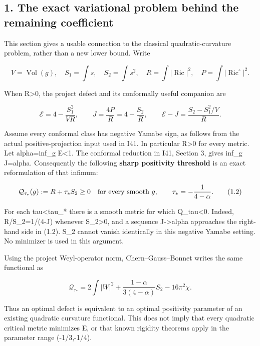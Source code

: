 \documentclass[
  10pt,
]{article}
\begin{document}
\hypertarget{the-exact-variational-problem-behind-the-remaining-coefficient}{%
\subsection{1. The exact variational problem behind the remaining
coefficient}\label{the-exact-variational-problem-behind-the-remaining-coefficient}}

This section gives a usable connection to the classical
quadratic-curvature problem, rather than a new lower bound. Write

\[
 V=\operatorname{Vol}(g),\quad S_1=\int s,\quad S_2=\int s^2,
 \quad R=\int|\operatorname{Ric}|^2,\quad
 P=\int|\operatorname{Ric}^{\circ}|^2.
\]

When R\textgreater0, the project defect and its conformally useful
companion are

\[
 \mathcal E=4-\frac{S_1^2}{VR},\qquad
 J=\frac{4P}{R}=4-\frac{S_2}{R},\qquad
 \mathcal E-J=\frac{S_2-S_1^2/V}{R}.                 \tag{1.1}
\]

Assume every conformal class has negative Yamabe sign, as follows from
the actual positive-projection input used in I41. In particular
R\textgreater0 for every metric. Let alpha=inf\_g E\textless1. The
conformal reduction in I41, Section 3, gives inf\_g J=alpha.
Consequently the following \textbf{sharp positivity threshold} is an
exact reformulation of that infimum:

\[
 \mathcal Q_{\tau_*}(g):=R+\tau_*S_2\ge0\quad
 \hbox{for every smooth }g,\qquad
 \tau_*=-\frac1{4-\alpha}.                            \tag{1.2}
\]

For each tau\textless tau\_* there is a smooth metric for which
Q\_tau\textless0. Indeed, R/S\_2=1/(4-J) whenever S\_2\textgreater0, and
a sequence J-\textgreater alpha approaches the right-hand side in (1.2).
S\_2 cannot vanish identically in this negative Yamabe setting. No
minimizer is used in this argument.

Using the project Weyl-operator norm, Chern--Gauss--Bonnet writes the
same functional as

\[
 \mathcal Q_{\tau_*}
 =2\int|W|^2+
   \frac{1-\alpha}{3(4-\alpha)}S_2-16\pi^2\chi.       \tag{1.3}
\]

Thus an optimal defect is equivalent to an optimal positivity parameter
of an existing quadratic curvature functional. This does not imply that
every quadratic critical metric minimizes E, or that known rigidity
theorems apply in the parameter range (-1/3,-1/4).
\end{document}
